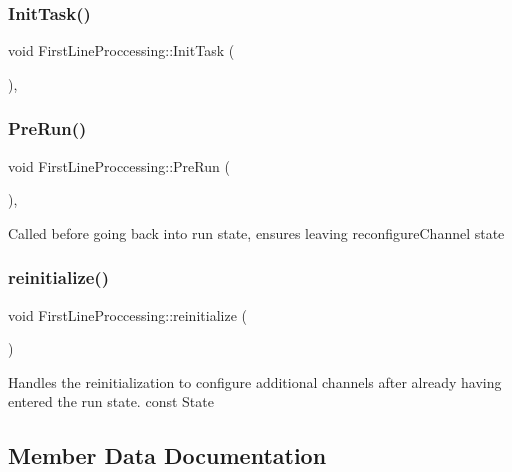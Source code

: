 \subsubsection{\texorpdfstring{Init\+Task()}{InitTask()}}
{\footnotesize\ttfamily void First\+Line\+Proccessing\+::\+Init\+Task (\begin{DoxyParamCaption}{ }\end{DoxyParamCaption})\hspace{0.3cm}{\ttfamily [override]}, {\ttfamily [protected]}}

\mbox{\label{classFirstLineProccessing_aa514bbe1aeeebc117747a14469964d46}} 
\subsubsection{\texorpdfstring{Pre\+Run()}{PreRun()}}
{\footnotesize\ttfamily void First\+Line\+Proccessing\+::\+Pre\+Run (\begin{DoxyParamCaption}{ }\end{DoxyParamCaption})\hspace{0.3cm}{\ttfamily [override]}, {\ttfamily [protected]}}

Called before going back into run state, ensures leaving reconfigure\+Channel state \mbox{\label{classFirstLineProccessing_a13a9efcb3ab178f40c3ad371f0b87403}} 
\subsubsection{\texorpdfstring{reinitialize()}{reinitialize()}}
{\footnotesize\ttfamily void First\+Line\+Proccessing\+::reinitialize (\begin{DoxyParamCaption}{ }\end{DoxyParamCaption})\hspace{0.3cm}{\ttfamily [protected]}}

Handles the reinitialization to configure additional channels after already having entered the run state.  const State 

\subsection{Member Data Documentation}
\mbox{\label{classFirstLineProccessing_ab538ebe611859171e4ed3203be54cd67}} 
